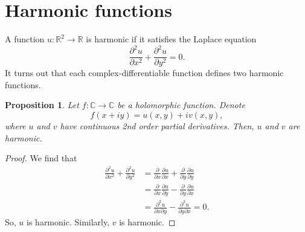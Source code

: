 \documentclass[a4paper, openany]{memoir}
\theoremstyle{definition}
\theoremstyle{plain}
\newtheorem{proposition}[definition]{Proposition}
\begin{document}
\section{Harmonic functions}
A function $u: \mathbb{R}^2 \to \mathbb{R}$ is harmonic if it satisfies the Laplace equation
\[\frac{\partial^2 u}{\partial x^2} + \frac{\partial^2 u}{\partial y^2} = 0.\]
It turns out that each complex-differentiable function defines two harmonic functions.
\begin{proposition}
Let $f: \mathbb{C} \to \mathbb{C}$ be a holomorphic function. Denote
\[f(x + iy) = u(x, y) + iv(x, y),\]
where $u$ and $v$ have continuous 2nd order partial derivatives. Then, $u$ and $v$ are harmonic.
\end{proposition}
\begin{proof}
We find that
\begin{align*}
    \frac{\partial^2 u}{\partial x^2} + \frac{\partial^2 u}{\partial y^2} &= \frac{\partial}{\partial x} \frac{\partial u}{\partial x} + \frac{\partial}{\partial y} \frac{\partial u}{\partial y} \\
    &= \frac{\partial}{\partial x} \frac{\partial u}{\partial y} - \frac{\partial}{\partial y} \frac{\partial u}{\partial x} \\
    &= \frac{\partial^2 u}{\partial x \partial y} - \frac{\partial^2 u}{\partial y \partial x} = 0.
\end{align*}
So, $u$ is harmonic. Similarly, $v$ is harmonic.
\end{proof}
\end{document}
